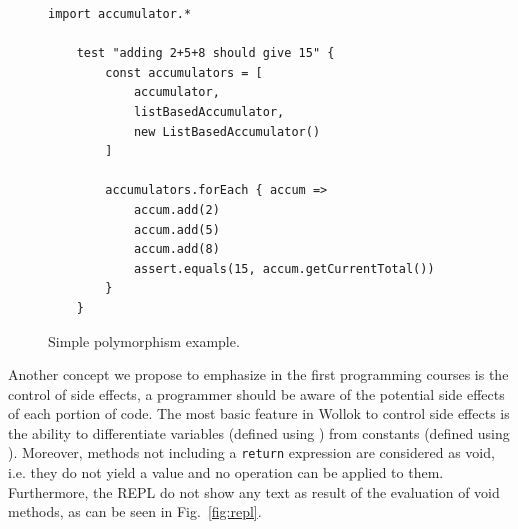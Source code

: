 \vspace{-3mm}
\begin{figure}[ht]
 \centering
 \begin{lstlisting}[language=Wollok]
 	import accumulator.*

	test "adding 2+5+8 should give 15" {
		const accumulators = [ 
			accumulator, 
			listBasedAccumulator,
			new ListBasedAccumulator()
		]

		accumulators.forEach { accum =>
			accum.add(2)
			accum.add(5)
			accum.add(8)
			assert.equals(15, accum.getCurrentTotal())	
		}
	}\end{lstlisting}
\vspace{-3mm}
\caption{\small Simple polymorphism example.}
\label{fig:polymorphism}
\end{figure}

Another concept we propose to emphasize in the first programming courses is the control of side effects, 
\ie a programmer should be aware of the potential side effects of each portion of code.
The most basic feature in Wollok to control side effects is the ability to 
differentiate variables (defined using )
from constants (defined using ).
Moreover, methods not including a \texttt{return} expression are considered as void, i.e. they do not yield a value and no operation can be applied to them. Furthermore, the REPL do not show any text as result of the evaluation of void methods, as can be seen in Fig.~\ref{fig:repl}.
